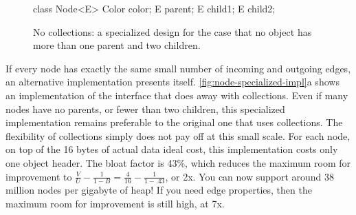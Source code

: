 \begin{figure}
\centering
\begin{minipage}[b]{0.24\textwidth}
\begin{framedlisting}
class Node<E> {
   Color color;
   E parent;
   E child1;
   E child2;
}
\end{framedlisting}
\end{minipage}
\caption{No collections: a specialized design for the case that
no object has more than one parent and two children.}
\label{fig:node-specialized-impl}
\end{figure} 
If every node has exactly the same small number of incoming and outgoing edges,
an alternative implementation presents itself.
\autoref{fig:node-specialized-impl}a shows an implementation of the 
interface that does away with collections.
Even if many nodes have no parents, or fewer than two children, this
specialized implementation remains preferable to the original one that uses
collections. The flexibility of collections simply does not pay off at this
small scale.
For each node, on top of the 16 bytes of actual data ideal cost, this
implementation costs only one object header. The bloat factor is 43\%, which
reduces the maximum room for improvement to $\frac{V}{U}-\frac{1}{1-B}=
\frac{4}{16}-\frac{1}{1-.43}$, or 2x. You can now support around 38 million
nodes per gigabyte of heap! If you need edge properties, then the maximum room
for improvement is still high, at 7x.



